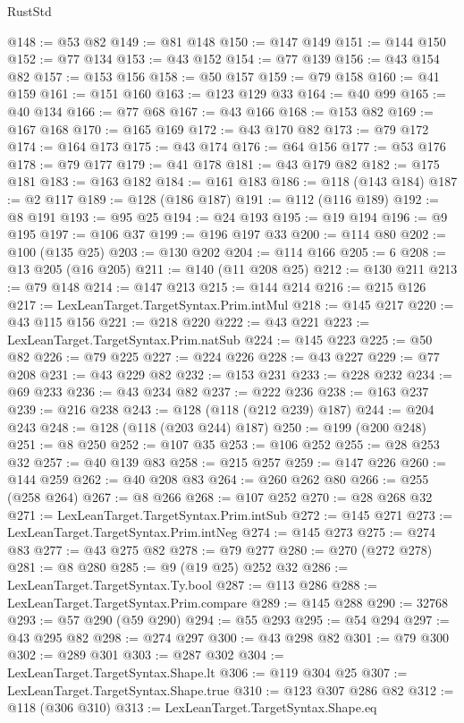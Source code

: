 \begin{lexlean}{RustStd}
\begin{coremodule}
@148 := @53 @82
@149 := @81 @148
@150 := @147 @149
@151 := @144 @150
@152 := @77 @134
@153 := @43 @152
@154 := @77 @139
@156 := @43 @154 @82
@157 := @153 @156
@158 := @50 @157
@159 := @79 @158
@160 := @41 @159
@161 := @151 @160
@163 := @123 @129 @33
@164 := @40 @99
@165 := @40 @134
@166 := @77 @68
@167 := @43 @166
@168 := @153 @82
@169 := @167 @168
@170 := @165 @169
@172 := @43 @170 @82
@173 := @79 @172
@174 := @164 @173
@175 := @43 @174
@176 := @64 @156
@177 := @53 @176
@178 := @79 @177
@179 := @41 @178
@181 := @43 @179 @82
@182 := @175 @181
@183 := @163 @182
@184 := @161 @183
@186 := @118 (@143 @184)
@187 := @2 @117
@189 := @128 (@186 @187)
@191 := @112 (@116 @189)
@192 := @8 @191
@193 := @95 @25
@194 := @24 @193
@195 := @19 @194
@196 := @9 @195
@197 := @106 @37
@199 := @196 @197 @33
@200 := @114 @80
@202 := @100 (@135 @25)
@203 := @130 @202
@204 := @114 @166
@205 := 6
@208 := @13 @205 (@16 @205)
@211 := @140 (@11 @208 @25)
@212 := @130 @211
@213 := @79 @148
@214 := @147 @213
@215 := @144 @214
@216 := @215 @126
@217 := LexLeanTarget.TargetSyntax.Prim.intMul
@218 := @145 @217
@220 := @43 @115 @156
@221 := @218 @220
@222 := @43 @221
@223 := LexLeanTarget.TargetSyntax.Prim.natSub
@224 := @145 @223
@225 := @50 @82
@226 := @79 @225
@227 := @224 @226
@228 := @43 @227
@229 := @77 @208
@231 := @43 @229 @82
@232 := @153 @231
@233 := @228 @232
@234 := @69 @233
@236 := @43 @234 @82
@237 := @222 @236
@238 := @163 @237
@239 := @216 @238
@243 := @128 (@118 (@212 @239) @187)
@244 := @204 @243
@248 := @128 (@118 (@203 @244) @187)
@250 := @199 (@200 @248)
@251 := @8 @250
@252 := @107 @35
@253 := @106 @252
@255 := @28 @253 @32
@257 := @40 @139 @83
@258 := @215 @257
@259 := @147 @226
@260 := @144 @259
@262 := @40 @208 @83
@264 := @260 @262 @80
@266 := @255 (@258 @264)
@267 := @8 @266
@268 := @107 @252
@270 := @28 @268 @32
@271 := LexLeanTarget.TargetSyntax.Prim.intSub
@272 := @145 @271
@273 := LexLeanTarget.TargetSyntax.Prim.intNeg
@274 := @145 @273
@275 := @274 @83
@277 := @43 @275 @82
@278 := @79 @277
@280 := @270 (@272 @278)
@281 := @8 @280
@285 := @9 (@19 @25) @252 @32
@286 := LexLeanTarget.TargetSyntax.Ty.bool
@287 := @113 @286
@288 := LexLeanTarget.TargetSyntax.Prim.compare
@289 := @145 @288
@290 := 32768
@293 := @57 @290 (@59 @290)
@294 := @55 @293
@295 := @54 @294
@297 := @43 @295 @82
@298 := @274 @297
@300 := @43 @298 @82
@301 := @79 @300
@302 := @289 @301
@303 := @287 @302
@304 := LexLeanTarget.TargetSyntax.Shape.lt
@306 := @119 @304 @25
@307 := LexLeanTarget.TargetSyntax.Shape.true
@310 := @123 @307 @286 @82
@312 := @118 (@306 @310)
@313 := LexLeanTarget.TargetSyntax.Shape.eq

\end{coremodule}
\end{lexlean}
